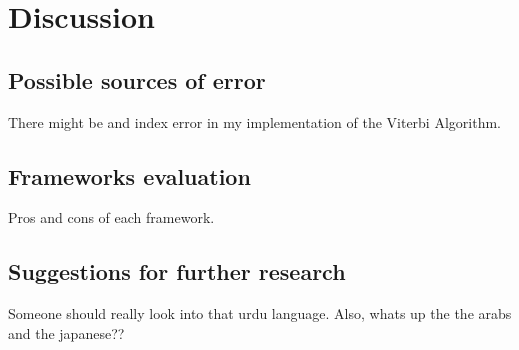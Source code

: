
\section{Discussion}

\subsection{Possible sources of error}

There might be and index error in my implementation of the Viterbi Algorithm.


\subsection{Frameworks evaluation}
\label{subsec:frameworks}

Pros and cons of each framework.


\subsection{Suggestions for further research}

Someone should really look into that urdu language. Also, whats up the the arabs
and the japanese??


\pagebreak
